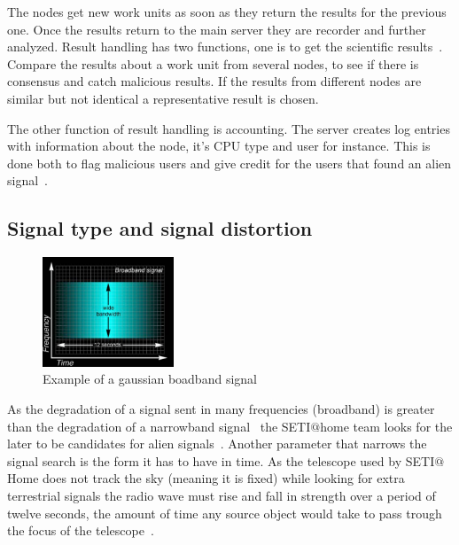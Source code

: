 The nodes get new work units as soon as they return the results for the 
previous one. Once the results return to the main server they are recorder 
and further analyzed. Result handling has two functions, one is to 
get the scientific results~\cite{hid-sp18-601-paper-anderson2002seti}. 
Compare the results about a work unit from several nodes, to see if there 
is consensus and catch malicious results. 
If the results from different nodes are similar but not identical a 
representative result is chosen.

The other function of result handling is accounting. The server creates 
log entries with information about the node, it's CPU type and user for 
instance. This is done both to flag malicious users and give credit for
the users that found an alien signal~\cite{hid-sp18-601-paper-anderson2002seti}.

\subsection{Signal type and signal distortion}\label{hid-sp18-601-subsection-signal}
\begin{figure}[!htb]
        \centering
        \includegraphics[width=0.35\textwidth]{figures/broadband.pdf}
        \caption{Example of a gaussian boadband
        signal~\cite{hid-sp18-601-www-sathome-howworks}}\label{broadbandfigure}
\end{figure}
As the degradation of a signal sent in many frequencies (broadband) is greater 
than the degradation of a narrowband 
signal~\cite{hid-sp18-601-www-sathome-interference} the SETI$@$home team looks
 for the later to be candidates for alien 
 signals~\cite{hid-sp18-601-www-sathome-howworks}. Another parameter that 
 narrows the signal search is the form it has to have in time. As the telescope 
 used by SETI$@$Home does not track the sky (meaning it is fixed) while looking 
 for extra terrestrial signals the radio wave must rise and fall in strength 
 over a period of twelve seconds, the amount of time any source object would 
 take  to pass trough the focus of the 
 telescope~\cite{hid-sp18-601-www-sathome-interference}.

